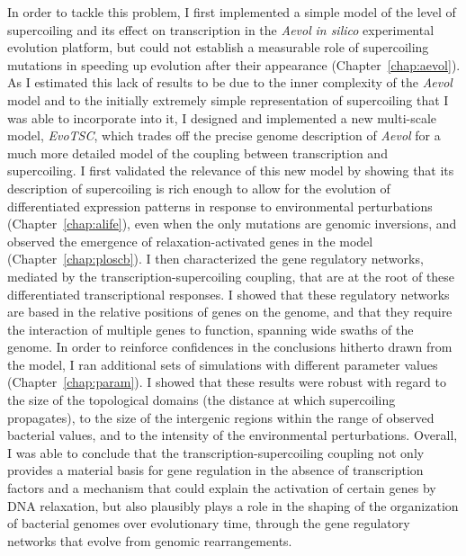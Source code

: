 In order to tackle this problem, I first implemented a simple model of the level of supercoiling and its effect on transcription in the \emph{Aevol} \emph{in silico} experimental evolution platform, but could not establish a measurable role of supercoiling mutations in speeding up evolution after their appearance (Chapter~\ref{chap:aevol}).
As I estimated this lack of results to be due to the inner complexity of the \emph{Aevol} model and to the initially extremely simple representation of supercoiling that I was able to incorporate into it, I designed and implemented a new multi-scale model, \emph{EvoTSC}, which trades off the precise genome description of \emph{Aevol} for a much more detailed model of the coupling between transcription and supercoiling.
I first validated the relevance of this new model by showing that its description of supercoiling is rich enough to allow for the evolution of differentiated expression patterns in response to environmental perturbations (Chapter~\ref{chap:alife}), even when the only mutations are genomic inversions, and observed the emergence of relaxation-activated genes in the model (Chapter~\ref{chap:ploscb}).
I then characterized the gene regulatory networks, mediated by the transcription-supercoiling coupling, that are at the root of these differentiated transcriptional responses.
I showed that these regulatory networks are based in the relative positions of genes on the genome, and that they require the interaction of multiple genes to function, spanning wide swaths of the genome.
In order to reinforce confidences in the conclusions hitherto drawn from the model, I ran additional sets of simulations with different parameter values (Chapter~\ref{chap:param}).
I showed that these results were robust with regard to the size of the topological domains (the distance at which supercoiling propagates), to the size of the intergenic regions within the range of observed bacterial values, and to the intensity of the environmental perturbations.
Overall, I was able to conclude that the transcription-supercoiling coupling not only provides a material basis for gene regulation in the absence of transcription factors and a mechanism that could explain the activation of certain genes by DNA relaxation, but also plausibly plays a role in the shaping of the organization of bacterial genomes over evolutionary time, through the gene regulatory networks that evolve from genomic rearrangements.


